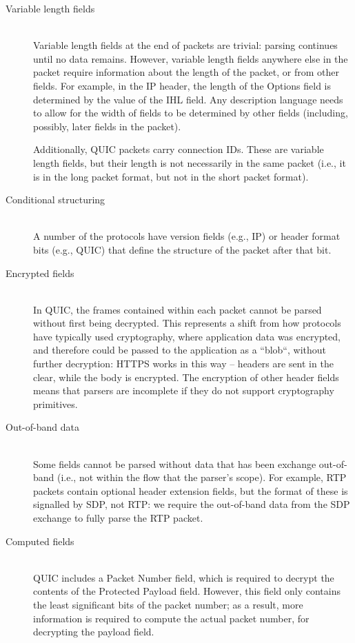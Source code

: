 \documentclass[10pt,a4paper]{article}
\begin{document}
\begin{description}
	\item[Variable length fields] \hfill \\
	Variable length fields at the end of packets are trivial: parsing continues until no
	data remains. However, variable length fields anywhere else in the packet require
	information about the length of the packet, or from other fields. For example, in the
	IP header, the length of the Options field is determined by the value of the IHL
	field. Any description language needs to allow for the width of fields to be determined
  by other fields (including, possibly, later fields in the packet).
	
	Additionally, QUIC packets carry connection IDs. These are variable length fields, but
	their length is not necessarily in the same packet (i.e., it is in the long packet
	format, but not in the short packet format).  
	\item[Conditional structuring] \hfill \\
	A number of the protocols have version fields (e.g., IP) or header format bits (e.g.,
	QUIC) that define the structure of the packet after that bit.
	\item[Encrypted fields] \hfill \\
	In QUIC, the frames contained within each packet cannot be parsed without first being
	decrypted. This represents a shift from how protocols have typically used cryptography,
	where application data was encrypted, and therefore could be passed to the application
	as a ``blob``, without further decryption: HTTPS works in this way -- headers are sent
	in the clear, while the body is encrypted. The encryption of other header fields means
	that parsers are incomplete if they do not support cryptography primitives.
	\item[Out-of-band data] \hfill \\
	Some fields cannot be parsed without data that has been exchange out-of-band (i.e.,
	not within the flow that the parser's scope). For example, RTP packets contain
	optional header extension fields, but the format of these is signalled by SDP, not
	RTP: we require the out-of-band data from the SDP exchange to fully parse the RTP
	packet.
	\item[Computed fields] \hfill \\
	QUIC includes a Packet Number field, which is required to decrypt the contents of the
	Protected Payload field. However, this field only contains the least significant bits
	of the packet number; as a result, more information is required to compute the actual
	packet number, for decrypting the payload field.
\end{description}
\end{document}
